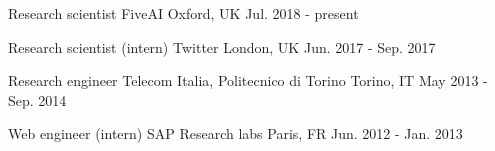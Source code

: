 

\begin{cvjobs}
  \cvjob
    {Research scientist} %
    {FiveAI} %
    {Oxford, UK} %
    {Jul. 2018 - present} %
    {
    }


  \cvjob
    {Research scientist (intern)} %
    {Twitter} %
    {London, UK} %
    {Jun. 2017 - Sep. 2017} %

  \cvjob
    {Research engineer} %
    {Telecom Italia, Politecnico di Torino} %
    {Torino, IT} %
    {May 2013 - Sep. 2014} %

  \cvjob
    {Web engineer (intern)} %
    {SAP Research labs} %
    {Paris, FR} %
    {Jun. 2012 - Jan. 2013} %
    
\end{cvjobs}
